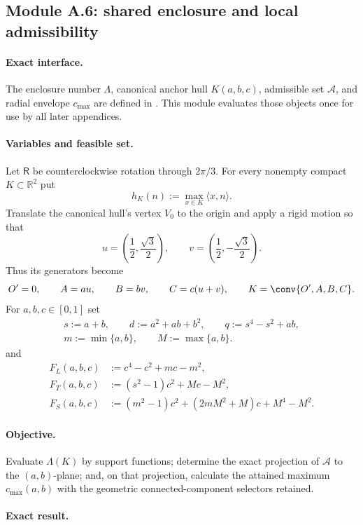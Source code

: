 \subsection{Module A.6: shared enclosure and local admissibility}
\label{sec:admissible-set-derivation}

\paragraph{Exact interface.}
The enclosure number $\Lambda$, canonical anchor hull $K(a,b,c)$,
admissible set $\mathcal A$, and radial envelope $c_{\max}$ are defined in
.  This
module evaluates those objects once for use by all later appendices.

\paragraph{Variables and feasible set.}
Let $\mathsf R$ be counterclockwise rotation through $2\pi/3$.  For every
nonempty compact $K\subset\mathbb R^2$ put
\[
 h_K(n):=\max_{x\in K}\langle x,n\rangle.
\]
Translate the canonical hull's vertex $V_0$ to the origin and apply a rigid
motion so that
\[
 u=\left(\frac12,\frac{\sqrt3}{2}\right),
 \qquad
 v=\left(\frac12,-\frac{\sqrt3}{2}\right).
\]
Thus its generators become
\[
 O'=0,
 \qquad A=au,
 \qquad B=bv,
 \qquad C=c(u+v),
 \qquad K=\conv\{O',A,B,C\}.
\]
For $a,b,c\in[0,1]$ set
\[
 \begin{gathered}
 s:=a+b,
 \qquad d:=a^2+ab+b^2,
 \qquad q:=s^4-s^2+ab,\\
 m:=\min\{a,b\},
 \qquad M:=\max\{a,b\}.
 \end{gathered}
\]
and
\begin{align*}
 F_L(a,b,c)&:=c^4-c^2+mc-m^2,\\
 F_T(a,b,c)&:=(s^2-1)c^2+Mc-M^2,\\
 F_S(a,b,c)&:=(m^2-1)c^2+(2mM^2+M)c+M^4-M^2.
\end{align*}

\paragraph{Objective.}
Evaluate $\Lambda(K)$ by support functions; determine the exact projection of
$\mathcal A$ to the $(a,b)$-plane; and, on that projection, calculate the
attained maximum $c_{\max}(a,b)$ with the geometric connected-component
selectors retained.

\paragraph{Exact result.}

